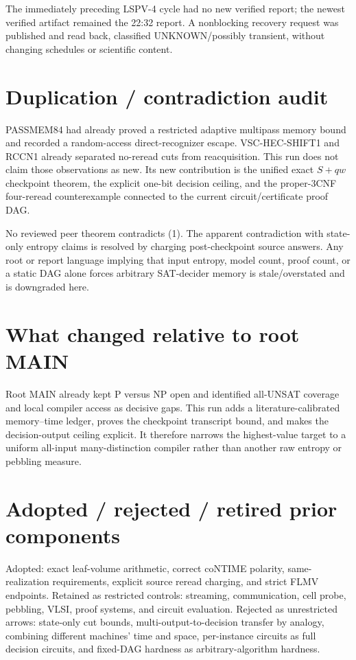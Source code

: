 \documentclass[11pt]{article}
\begin{document}
The immediately preceding LSPV-4 cycle had no new verified report; the newest verified
artifact remained the 22:32 report.  A nonblocking recovery request was published and
read back, classified UNKNOWN/possibly transient, without changing schedules or
scientific content.

\section*{Duplication / contradiction audit}
PASSMEM84 had already proved a restricted adaptive multipass memory bound and recorded
a random-access direct-recognizer escape.  VSC-HEC-SHIFT1 and RCCN1 already separated
no-reread cuts from reacquisition.  This run does not claim those observations as new.
Its new contribution is the unified exact $S+qw$ checkpoint theorem, the explicit
one-bit decision ceiling, and the proper-3CNF four-reread counterexample connected to
the current circuit/certificate proof DAG.

No reviewed peer theorem contradicts (1).  The apparent contradiction with state-only
entropy claims is resolved by charging post-checkpoint source answers.  Any root or
report language implying that input entropy, model count, proof count, or a static DAG
alone forces arbitrary SAT-decider memory is stale/overstated and is downgraded here.

\section*{What changed relative to root MAIN}
Root MAIN already kept P versus NP open and identified all-UNSAT coverage and local
compiler access as decisive gaps.  This run adds a literature-calibrated memory--time
ledger, proves the checkpoint transcript bound, and makes the decision-output ceiling
explicit.  It therefore narrows the highest-value target to a uniform all-input
many-distinction compiler rather than another raw entropy or pebbling measure.

\section*{Adopted / rejected / retired prior components}
Adopted: exact leaf-volume arithmetic, correct coNTIME polarity, same-realization
requirements, explicit source reread charging, and strict FLMV endpoints.  Retained as
restricted controls: streaming, communication, cell probe, pebbling, VLSI, proof
systems, and circuit evaluation.  Rejected as unrestricted arrows: state-only cut
bounds, multi-output-to-decision transfer by analogy, combining different machines'
time and space, per-instance circuits as full decision circuits, and fixed-DAG hardness
as arbitrary-algorithm hardness.
\end{document}
